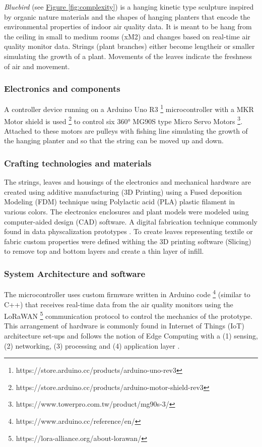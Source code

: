 \textit{Bluebird} (see \hyperref[fig:complexity]{Figure \ref*{fig:complexity}}) is a hanging kinetic type sculpture inspired by organic nature materials and the shapes of hanging planters that encode the environmental properties of indoor air quality data. It is meant to be hang from the ceiling in small to medium rooms (xM2) and changes based on real-time air quality monitor data. Strings (plant branches) either become lengtheir or smaller simulating the growth of a plant. Movements of the leaves indicate the freshness of air and movement.

\subsubsection{Electronics and components}

A controller device running on a Arduino Uno R3 \footnote{https://store.arduino.cc/products/arduino-uno-rev3} microcontroller with a MKR Motor shield is used \footnote{https://store.arduino.cc/products/arduino-motor-shield-rev3} to control six 360° MG90S type Micro Servo Motors \footnote{https://www.towerpro.com.tw/product/mg90s-3/}. Attached to these motors are pulleys with fishing line simulating the growth of the hanging planter and so that the string can be moved up and down.


\subsubsection{Crafting technologies and materials}
The strings, leaves and housings of the electronics and mechanical hardware are created using additive manufacturing (3D Printing) using a Fused deposition Modeling (FDM) technique using Polylactic acid (PLA) plastic filament in various colors. The electronics enclosures and plant models were modeled using computer-aided design (CAD) software. A digital fabrication technique commonly found in data physcalization prototypes \cite{anhalt_university_germany_design_2022}. To create leaves representing textile or fabric custom properties were defined withing the 3D printing software (Slicing) to remove top and bottom layers and create a thin layer of infill.

\subsubsection{System Architecture and software}

The microcontroller uses custom firmware written in Arduino code \footnote{https://www.arduino.cc/reference/en/} (similar to C++) that receives real-time data from the air quality monitors using the LoRaWAN \footnote{https://lora-alliance.org/about-lorawan/} communication protocol to control the mechanics of the prototype. This arrangement of hardware is commonly found in Internet of Things (IoT) architecture set-ups and follows the notion of Edge Computing with a (1) sensing, (2) networking, (3) processing and (4) application layer \cite{li_edge-oriented_2019, idrees_edge_2018}.

